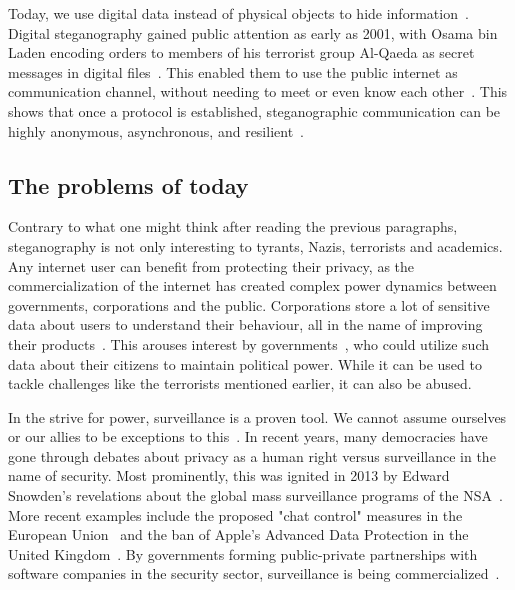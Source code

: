 Today, we use digital data instead of physical objects to hide information~\cite{bennettLinguisticSteganographySurvey2004}. Digital steganography gained public attention as early as 2001, with Osama bin Laden encoding orders to members of his terrorist group Al-Qaeda as secret messages in digital files~\cite{dembartEndUserHide2001,schneierTerroristsSteganography2001}. This enabled them to use the public internet as communication channel, without needing to meet or even know each other~\cite{schneierTerroristsSteganography2001}. This shows that once a protocol is established, steganographic communication can be highly anonymous, asynchronous, and resilient~\cite{schneierTerroristsSteganography2001}.

\subsection{The problems of today}
\label{sec:theProblemsOfToday}
Contrary to what one might think after reading the previous paragraphs, steganography is not only interesting to tyrants, Nazis, terrorists and academics. Any internet user can benefit from protecting their privacy, as the commercialization of the internet has created complex power dynamics between governments, corporations and the public. Corporations store a lot of sensitive data about users to understand their behaviour, all in the name of improving their products~\cite{duportailAskedTinderMy2017,titcombMillionsPeoplesDNA2025}. This arouses interest by governments~\cite{greenwaldNSAPrismProgram2013}, who could utilize such data about their citizens to maintain political power. While it can be used to tackle challenges like the terrorists mentioned earlier, it can also be abused.

In the strive for power, surveillance is a proven tool. We cannot assume ourselves or our allies to be exceptions to this~\cite{macaskillGCHQTapsFibreoptic2013}. In recent years, many democracies have gone through debates about privacy as a human right versus surveillance in the name of security. Most prominently, this was ignited in 2013 by Edward Snowden's revelations about the global mass surveillance programs of the \gls{NSA}~\cite{greenwaldEdwardSnowdenWhistleblower2013}. More recent examples include the proposed "chat control" measures in the European Union~\cite{danielChatControlEnd2024} and the ban of Apple's Advanced Data Protection in the United Kingdom~\cite{kleinmanUKGovernmentDemands2025,kleinmanApplePullsData2025}. By governments forming public-private partnerships with software companies in the security sector, surveillance is being commercialized~\cite{bbcPegasusSpywareSold2021,kasterPrivatizedEspionageNSO2023}.

